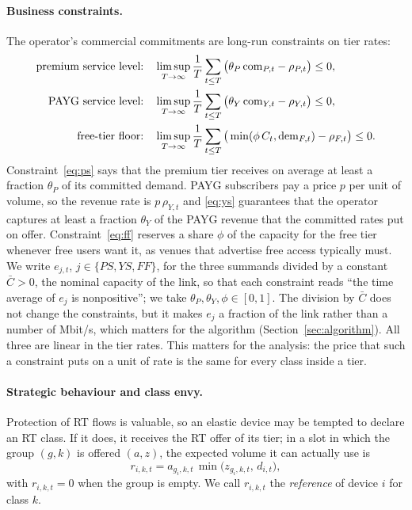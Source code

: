 \paragraph{Business constraints.}
The operator's commercial commitments are long-run constraints on tier rates:
\begin{align}
\text{premium service level:}\quad &\limsup_{T\to\infty}\frac1T\sum_{t\le T}\big(\theta_P\,\mathrm{com}_{P,t}-\rho_{P,t}\big)\le 0,\label{eq:ps}\\
\text{PAYG service level:}\quad &\limsup_{T\to\infty}\frac1T\sum_{t\le T}\big(\theta_Y\,\mathrm{com}_{Y,t}-\rho_{Y,t}\big)\le 0,\label{eq:ys}\\
\text{free-tier floor:}\quad &\limsup_{T\to\infty}\frac1T\sum_{t\le T}\big(\min(\phi\,C_t,\mathrm{dem}_{F,t})-\rho_{F,t}\big)\le 0.\label{eq:ff}
\end{align}
Constraint~\eqref{eq:ps} says that the premium tier receives on average at least a fraction $\theta_P$ of its committed demand.
PAYG subscribers pay a price $p$ per unit of volume, so the revenue rate is $p\,\rho_{Y,t}$ and \eqref{eq:ys} guarantees that the operator captures at least a fraction $\theta_Y$ of the PAYG revenue that the committed rates put on offer.
Constraint~\eqref{eq:ff} reserves a share $\phi$ of the capacity for the free tier whenever free users want it, as venues that advertise free access typically must.
We write $e_{j,t}$, $j\in\{PS,YS,FF\}$, for the three summands divided by a constant $\bar C>0$, the nominal capacity of the link, so that each constraint reads ``the time average of $e_j$ is nonpositive''; we take $\theta_P,\theta_Y,\phi\in[0,1]$.
The division by $\bar C$ does not change the constraints, but it makes $e_j$ a fraction of the link rather than a number of Mbit/s, which matters for the algorithm (Section~\ref{sec:algorithm}).
All three are linear in the tier rates. This matters for the analysis: the price that such a constraint puts on a unit of rate is the same for every class inside a tier.

\paragraph{Strategic behaviour and class envy.}
Protection of RT flows is valuable, so an elastic device may be tempted to declare an RT class.
If it does, it receives the RT offer of its tier; in a slot in which the group $(g,k)$ is offered $(a,z)$, the expected volume it can actually use is
\begin{equation}\label{eq:ref}
r_{i,k,t}=a_{g_i,k,t}\,\min\big(z_{g_i,k,t},\,d_{i,t}\big),
\end{equation}
with $r_{i,k,t}=0$ when the group is empty.
We call $r_{i,k,t}$ the \emph{reference} of device $i$ for class $k$.

